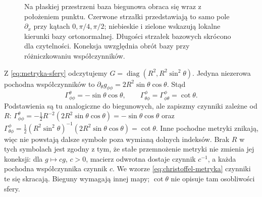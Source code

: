 \begin{figure}[H]
\centering
{}
\caption{Na płaskiej przestrzeni baza biegunowa obraca się
wraz z położeniem punktu. Czerwone strzałki przedstawiają
to samo pole $\partial_x$ przy kątach $0,\pi/4,\pi/2$;
niebieskie i zielone wskazują lokalne kierunki bazy ortonormalnej.
Długości strzałek bazowych skrócono dla czytelności.
Koneksja uwzględnia obrót bazy przy różniczkowaniu współczynników.}
\label{fig:koneksja-baza-biegunowa}
\end{figure}

\begin{przyklad}
\label{prz:christoffel-sfera}
Z \eqref{eq:metryka-sfery} odczytujemy
$G=\operatorname{diag}(R^2,R^2\sin^2\theta)$.
Jedyna niezerowa pochodna współczynników to
$\partial_\theta g_{\phi\phi}
=2R^2\sin\theta\cos\theta$. Stąd
\begin{equation}\label{eq:gamma-sfera}
 \Gamma^\theta_{\phi\phi}
   =-\sin\theta\cos\theta,
 \qquad
 \Gamma^\phi_{\theta\phi}
 =\Gamma^\phi_{\phi\theta}=\cot\theta.
\end{equation}
Podstawienia są tu analogiczne do biegunowych, ale
zapiszmy czynniki zależne od $R$:
$\Gamma^\theta_{\phi\phi}
=-\tfrac12R^{-2}(2R^2\sin\theta\cos\theta)
=-\sin\theta\cos\theta$ oraz
$\Gamma^\phi_{\theta\phi}
=\tfrac12(R^2\sin^2\theta)^{-1}
(2R^2\sin\theta\cos\theta)=\cot\theta$.
Inne pochodne metryki znikają, więc nie powstają dalsze
symbole poza wymianą dolnych indeksów.
Brak $R$ w tych symbolach jest zgodny z tym,
że stałe przemnożenie metryki nie zmienia
jej koneksji: dla $g\mapsto c g$, $c>0$,
macierz odwrotna dostaje czynnik $c^{-1}$,
a każda pochodna współczynnika czynnik $c$.
We wzorze \eqref{eq:christoffel-metryka} czynniki te się skracają.
Bieguny wymagają innej mapy;
$\cot\theta$ nie opisuje tam osobliwości sfery.
\end{przyklad}

